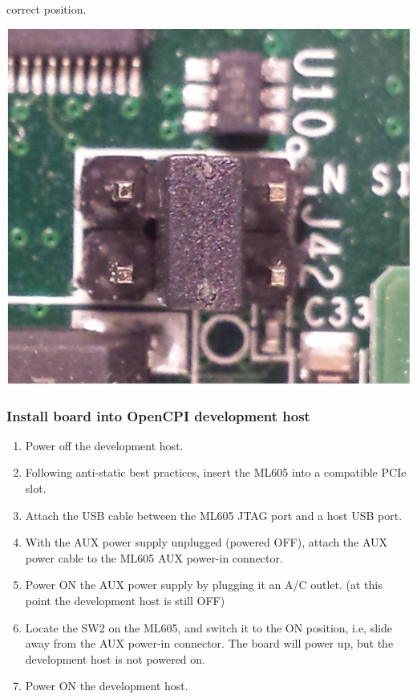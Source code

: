\begin{enumerate}
	correct position.
	\begin{center}
		\includegraphics[scale=0.15]{ML605_J42.jpg}\par\bigskip
	\end{center}
\end{enumerate}

\pagebreak
\subsubsection{Install board into OpenCPI development host}
\begin{enumerate}
	\item Power off the development host.
	\item Following anti-static best practices, insert the ML605
	into a compatible PCIe slot.
	\item Attach the USB cable between the ML605 JTAG port and a
	host USB port.
	\item With the AUX power supply unplugged (powered OFF), attach
	the AUX power cable to the ML605 AUX power-in connector.
	\item Power ON the AUX power supply by plugging it an A/C
	outlet. (at this point the development host is still OFF)
	\item Locate the SW2 on the ML605, and switch it to the ON
	position, i.e, slide away from the AUX power-in connector. The
	board will power up, but the development host is not powered on.
	\item Power ON the development host.
\end{enumerate}

